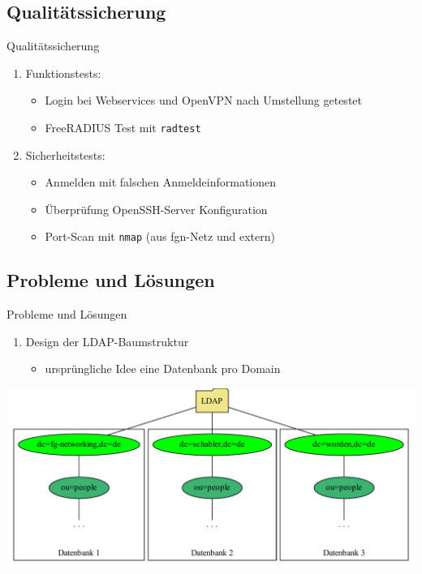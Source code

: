 \documentclass[presentation,svgnames,12pt]{beamer}
\begin{document}
\subsection{Qualitätssicherung}
\begin{frame}{Qualitätssicherung}
\begin{enumerate}
	\item Funktionstests:
	\vspace{6pt}
	\begin{itemize}
		\item Login bei Webservices und OpenVPN nach Umstellung getestet
		\item FreeRADIUS Test mit \texttt{radtest}
	\end{itemize}
	\item Sicherheitstests:
	\vspace{6pt}
	\begin{itemize}
		\item Anmelden mit falschen Anmeldeinformationen
		\item Überprüfung OpenSSH-Server Konfiguration
		\item Port-Scan mit \texttt{nmap} (aus fgn-Netz und extern)
	\end{itemize}
\end{enumerate}
\end{frame}

\subsection{Probleme und Lösungen}
\begin{frame}{Probleme und Lösungen}
\begin{enumerate}
	\item Design der LDAP-Baumstruktur
	\vspace{6pt}
	\begin{itemize}
		\item ursprüngliche Idee eine Datenbank pro Domain
	\end{itemize}
\end{enumerate}
\vspace{6pt}
\centering
\includegraphics[width=\textwidth]{Bilder/LDAP-fgn-planned.pdf}
\end{frame}
\end{document}
